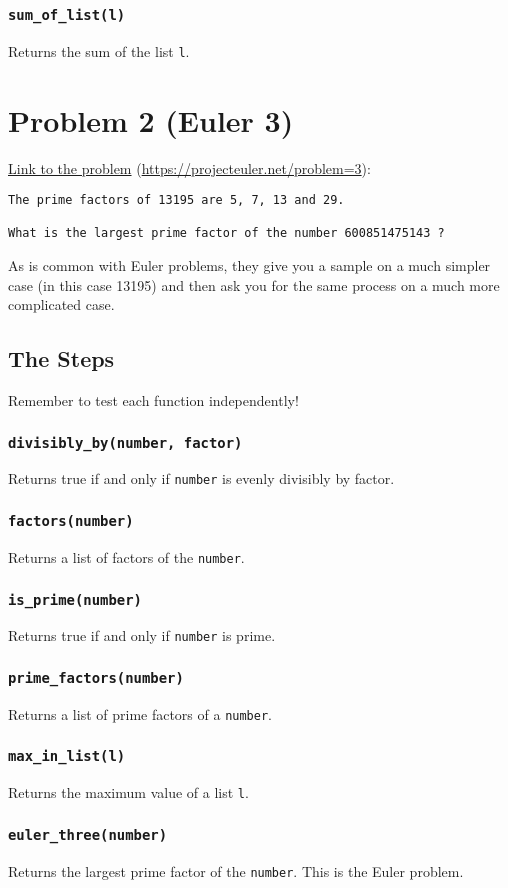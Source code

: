 \documentclass[11pt]{article}
\begin{document}
\subsubsection{\texttt{sum\_of\_list(l)}}
\label{sec:orgd1cea60}
Returns the sum of the list \texttt{l}.\\

\section{Problem 2 (Euler 3)}
\label{sec:org35b6b7a}
\href{https://projecteuler.net/problem=3}{Link to the problem} (\url{https://projecteuler.net/problem=3}):\\

\begin{verbatim}
The prime factors of 13195 are 5, 7, 13 and 29.

What is the largest prime factor of the number 600851475143 ?
\end{verbatim}

As is common with Euler problems, they give you a sample on a much simpler case (in this case 13195) and then ask you for the same process on a much more complicated case.\\

\subsection{The Steps}
\label{sec:orge8ff73a}
Remember to test each function independently!\\
\subsubsection{\texttt{divisibly\_by(number, factor)}}
\label{sec:org08b560d}
Returns true if and only if \texttt{number} is evenly divisibly by factor.\\
\subsubsection{\texttt{factors(number)}}
\label{sec:org6d07b41}
Returns a list of factors of the \texttt{number}.\\
\subsubsection{\texttt{is\_prime(number)}}
\label{sec:org1728973}
Returns true if and only if \texttt{number} is prime.\\
\subsubsection{\texttt{prime\_factors(number)}}
\label{sec:orge413652}
Returns a list of prime factors of a \texttt{number}.\\
\subsubsection{\texttt{max\_in\_list(l)}}
\label{sec:org7a06c12}
Returns the maximum value of a list \texttt{l}.\\
\subsubsection{\texttt{euler\_three(number)}}
\label{sec:org77fd58d}
Returns the largest prime factor of the \texttt{number}.  This is the Euler problem.\\
\end{document}
